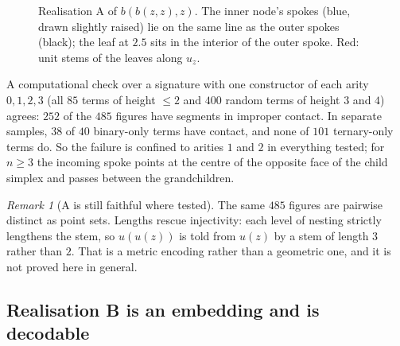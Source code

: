 \documentclass[11pt]{article}
\theoremstyle{definition}
\theoremstyle{remark}
\newtheorem{remark}[theorem]{Remark}
\begin{document}
\begin{figure}[h]
\centering
{}
\caption{Realisation A of $b(b(z,z),z)$. The inner node's spokes (blue, drawn
slightly raised) lie on the same line as the outer spokes (black); the leaf at
$2.5$ sits in the interior of the outer spoke. Red: unit stems of the leaves
along $u_z$.}\label{fig:comb}
\end{figure}

A computational check over a signature with one constructor of each arity
$0,1,2,3$ (all $85$ terms of height $\le2$ and $400$ random terms of height $3$
and $4$) agrees: $252$ of the $485$ figures have segments in improper contact.
In separate samples, $38$ of $40$ binary-only terms have contact, and none of
$101$ ternary-only terms do. So the failure is confined to arities $1$ and $2$ in
everything tested; for $n\ge3$ the incoming spoke points at the centre of the
opposite face of the child simplex and passes between the grandchildren.

\begin{remark}[A is still faithful where tested]
The same $485$ figures are pairwise distinct as point sets. Lengths rescue
injectivity: each level of nesting strictly lengthens the stem, so $u(u(z))$ is
told from $u(z)$ by a stem of length $3$ rather than $2$. That is a metric
encoding rather than a geometric one, and it is not proved here in general.
\end{remark}

\subsection{Realisation B is an embedding and is decodable}
\end{document}
